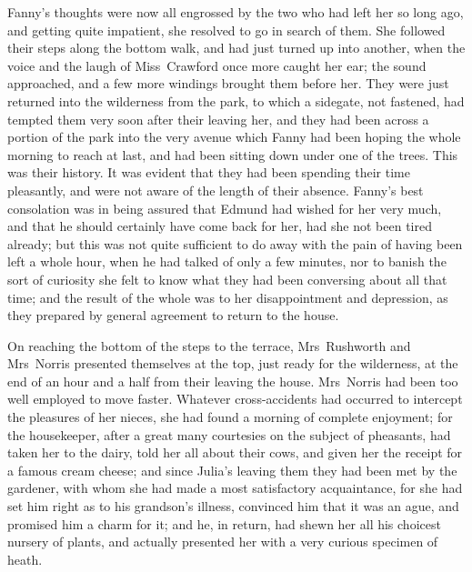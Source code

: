 Fanny's thoughts were now all engrossed by the two who had left her so long ago, and getting quite impatient, she resolved to go in search of them. She followed their steps along the bottom walk, and had just turned up into another, when the voice and the laugh of Miss~Crawford once more caught her ear; the sound approached, and a few more windings brought them before her. They were just returned into the wilderness from the park, to which a sidegate, not fastened, had tempted them very soon after their leaving her, and they had been across a portion of the park into the very avenue which Fanny had been hoping the whole morning to reach at last, and had been sitting down under one of the trees. This was their history. It was evident that they had been spending their time pleasantly, and were not aware of the length of their absence. Fanny's best consolation was in being assured that Edmund had wished for her very much, and that he should certainly have come back for her, had she not been tired already; but this was not quite sufficient to do away with the pain of having been left a whole hour, when he had talked of only a few minutes, nor to banish the sort of curiosity she felt to know what they had been conversing about all that time; and the result of the whole was to her disappointment and depression, as they prepared by general agreement to return to the house.

On reaching the bottom of the steps to the terrace, Mrs~Rushworth and Mrs~Norris presented themselves at the top, just ready for the wilderness, at the end of an hour and a half from their leaving the house. Mrs~Norris had been too well employed to move faster. Whatever cross-accidents had occurred to intercept the pleasures of her nieces, she had found a morning of complete enjoyment; for the housekeeper, after a great many courtesies on the subject of pheasants, had taken her to the dairy, told her all about their cows, and given her the receipt for a famous cream cheese; and since Julia's leaving them they had been met by the gardener, with whom she had made a most satisfactory acquaintance, for she had set him right as to his grandson's illness, convinced him that it was an ague, and promised him a charm for it; and he, in return, had shewn her all his choicest nursery of plants, and actually presented her with a very curious specimen of heath.

